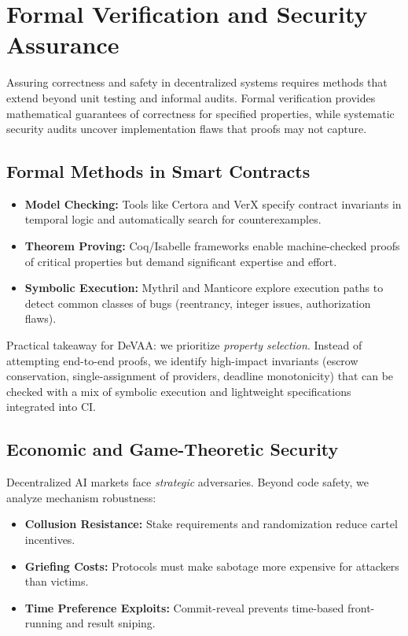 \section{Formal Verification and Security Assurance}

Assuring correctness and safety in decentralized systems requires methods that extend beyond unit testing and informal audits. Formal verification provides mathematical guarantees of correctness for specified properties, while systematic security audits uncover implementation flaws that proofs may not capture.

\subsection{Formal Methods in Smart Contracts}

\begin{itemize}
    \item \textbf{Model Checking:} Tools like Certora and VerX specify contract invariants in temporal logic and automatically search for counterexamples.
    \item \textbf{Theorem Proving:} Coq/Isabelle frameworks enable machine-checked proofs of critical properties but demand significant expertise and effort.
    \item \textbf{Symbolic Execution:} Mythril and Manticore explore execution paths to detect common classes of bugs (reentrancy, integer issues, authorization flaws).
\end{itemize}

\noindent Practical takeaway for DeVAA: we prioritize \emph{property selection}. Instead of attempting end-to-end proofs, we identify high-impact invariants (escrow conservation, single-assignment of providers, deadline monotonicity) that can be checked with a mix of symbolic execution and lightweight specifications integrated into CI.

\subsection{Economic and Game-Theoretic Security}

Decentralized AI markets face \emph{strategic} adversaries. Beyond code safety, we analyze mechanism robustness:
\begin{itemize}
    \item \textbf{Collusion Resistance:} Stake requirements and randomization reduce cartel incentives.
    \item \textbf{Griefing Costs:} Protocols must make sabotage more expensive for attackers than victims.
    \item \textbf{Time Preference Exploits:} Commit-reveal prevents time-based front-running and result sniping.
\end{itemize}


